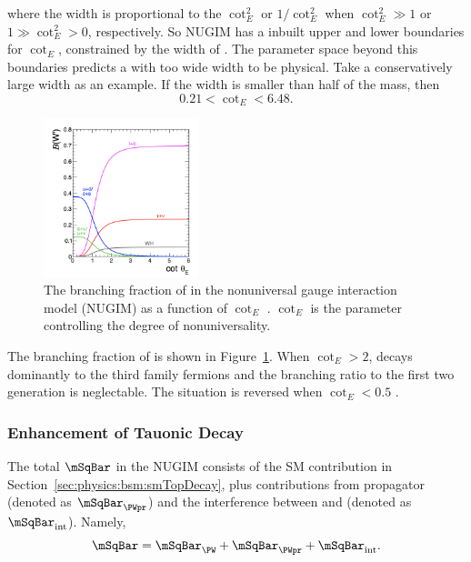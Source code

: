 \noindent where the width is proportional to the $ \cot^2_E $ or $ 1/\cot^2_E$ when $\cot^2_E \gg 1$ or $1 \gg \cot^2_E > 0$, respectively.  So NUGIM has a inbuilt upper and lower boundaries for $\cot_E$, constrained by the width of \PWpr. The parameter space beyond this boundaries predicts a \PWpr with too wide width to be physical.  Take a conservatively large width as an example. If the width is smaller than half of the \PWpr mass, then 
\begin{equation}
    0.21 < \cot_E < 6.48.
\end{equation}


\begin{figure}[ht]
    \centering
    \includegraphics[width=0.4\textwidth]{chapters/Physics/sectionBSM/figures/WPDecayBr.png}
    \caption{The branching fraction of \PWpr in the nonuniversal gauge interaction model (NUGIM) as a function of $\cot_E$ \cite{Sirunyan:2018lbg}. $\cot_E$ is the parameter controlling the degree of nonuniversality.}
    \label{fig:physics:bsm:WPrime:braching}
\end{figure}



\noindent The branching fraction of \PWpr is shown in Figure~\ref{fig:physics:bsm:WPrime:braching}. When $\cot_E > 2$, \PWpr decays dominantly to the third family fermions and the branching ratio to the first two generation is neglectable. The situation is reversed when $\cot_E<0.5$ .


\subsubsection{Enhancement of Tauonic Decay}

The total $\mSqBar$ in the NUGIM consists of the SM contribution in Section~\ref{sec:physics:bsm:smTopDecay}, plus contributions from \PWpr propagator (denoted as $\mSqBar _{\PWpr} $) and the interference between \PW and \PWpr (denoted as $\mSqBar_{\mathrm{int}} $). Namely,
\begin{equation}
	\mSqBar  = \mSqBar _{\PW} +  \mSqBar _{\PWpr} +  \mSqBar _{\mathrm{int}} .
\end{equation}


